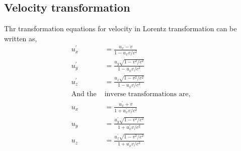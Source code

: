 \subsection{Velocity transformation}
Thr transformation equations for velocity in Lorentz transformation can be written as,
\begin{align*}
u_{x}^{\prime}&=\frac{u_{x}-v}{1-u_{x} v / c^{2}}\\u_{y}^{\prime}&=\frac{u_{y} \sqrt{1-v^{2} / c^{2}}}{1-u_{x} v / c^{2}}\\
u_{z}^{\prime}&=\frac{u_{z} \sqrt{1-v^{2} / c^{2}}}{1-{u_{x} v / c^{2}}}\\
\text{And the }&\text{inverse transformations are,}\\
u_{x}&=\frac{u_{x}^{\prime}+v}{1+u_{x}^{\prime} v / c^{2}}\\
u_{y}&=\frac{u_{y}^{\prime} \sqrt{1-v^{2} / c^{2}}}{1+u_{x}^{\prime} v / c^{2}}\\
u_{z}&=\frac{u_{z}^{\prime} \sqrt{1-v^{2} / c^{2}}}{1+u_{x}^{\prime} v / c^{2}}
\end{align*}
